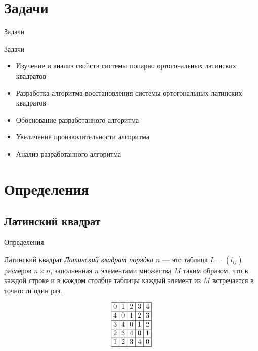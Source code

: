 \documentclass[8pt, hyperref={pdftex,unicode}, green]{beamer}
\newcommand{\LSfive}[1]{
    \begin{array}{|>{\hspace{-2pt}}c<{\hspace{-2pt}}|>{\hspace{-2pt}}c<{\hspace{-2pt}}|>{\hspace{-2pt}}c<{\hspace{-2pt}}|>{\hspace{-2pt}}c<{\hspace{-2pt}}|>{\hspace{-2pt}}c<{\hspace{-2pt}}|}\hline
        #1
    \end{array}
}
\begin{document}
\section{Задачи}
\begin{frame}{Задачи}

    \begin{block}{Задачи}
        \begin{itemize}
            \item Изучение и анализ свойств системы попарно ортогональных латинских квадратов
            \item Разработка алгоритма восстановления системы ортогональных латинских квадратов
            \item Обоснование разработанного алгоритма
            \item Увеличение производительности алгоритма
            \item Анализ разработанного алгоритма
        \end{itemize}
    \end{block}

\end{frame}

\section{Определения}
\subsection{Латинский квадрат}
\begin{frame}{Определения}

    \begin{block}{Латинский квадрат}
        {\it Латинский квадрат порядка $n$} — это таблица $L = (l_{ij})$ размеров $n\times n$, заполненная $n$ элементами множества $M$ таким образом, что в каждой строке и в каждом столбце таблицы каждый элемент из $M$ встречается в точности один раз.
    \end{block}
    
    $$
    \LSfive{0 & 1 & 2 & 3 & 4 \\ \hline
            4 & 0 & 1 & 2 & 3 \\ \hline
            3 & 4 & 0 & 1 & 2 \\ \hline
            2 & 3 & 4 & 0 & 1 \\ \hline
            1 & 2 & 3 & 4 & 0 \\ \hline}
    $$
\end{frame}
\end{document}
